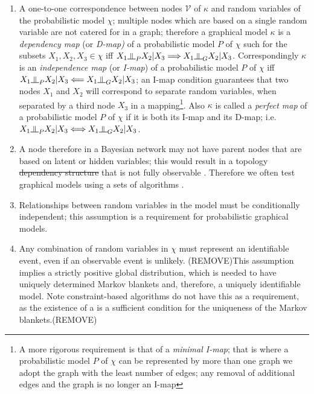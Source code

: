 \documentclass[7pt]{article}
\newcommand{\inperp}{\rotatebox[origin=c]{90}{$\models$}}
\begin{document}
\begin{enumerate}
	\item A one-to-one correspondence between nodes $\mathcal{V}$ of $\mathcal{\kappa}$ and random variables of the probabilistic model $\chi$; multiple nodes which are based on a single random variable are not catered for in a graph; therefore a graphical model $\mathcal{\kappa}$  is a \emph{dependency map} (or \emph{D-map)} of a probabilistic model $P$ of $\chi$ such for the subsets $X_1, X_2,X_3 \in \chi$ iff $X_1 \inperp_P X_2 | X_3 \Longrightarrow X_1 \inperp_G X_2 | X_3$. Correspondingly $\mathcal{\kappa}$ is an \emph {independence map} (or \emph{I-map}) of a probabilistic model $P$ of $\chi$ iff $X_1 \inperp_P X_2 | X_3 \Longleftarrow X_1 \inperp_G X_2 | X_3$; an I-map condition guarantees that two nodes $X_1$ and $X_2$ will correspond to separate random variables, when separated by a third node $X_3$ in a mapping\footnote{A more rigorous requirement is that of a \emph{minimal I-map}; that is where a probabilistic model $P$ of $\chi$ can be represented by more than one graph we adopt the graph with the least number of edges; any removal of additional edges and the graph is no longer an I-map}.  Also $\mathcal{\kappa}$ is called a \emph{perfect map} of a probabilistic model $P$ of $\chi$ if it is both its I-map and its D-map; i.e. $X_1 \inperp_P X_2 | X_3 \Longleftrightarrow X_1 \inperp_G X_2 | X_3$. 
	\item A node therefore in a Bayesian network may not have parent nodes that are based on latent or hidden variables; this would result in a topology \st{dependency structure} that is not fully observable \cite{elidan2005learning, binder1997adaptive}. Therefore we often test graphical models using a sets of algorithms \cite{dempster1977maximum, friedman1997bayesian}.
	\item  Relationships between random variables in the model must be conditionally independent; this assumption is a requirement for probabilistic graphical models. 
	\item Any combination of random variables in $\chi$ must represent an identifiable event, even if an observable event is unlikely. {(REMOVE)This assumption implies a strictly positive global distribution, which is needed to have uniquely determined Markov blankets and, therefore, a uniquely identifiable model. Note constraint-based algorithms do not have this as a requirement, as the existence of a  is a sufficient condition for the uniqueness of the Markov blankets.(REMOVE)}
\end{enumerate}
\end{document}
